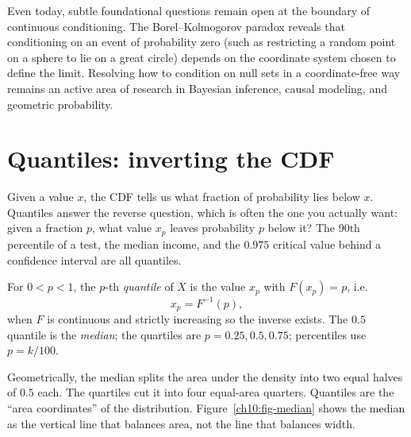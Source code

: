 \begin{historybox}
Even today, subtle foundational questions remain open at the boundary of continuous
conditioning. The Borel--Kolmogorov paradox reveals that conditioning on an event of
probability zero (such as restricting a random point on a sphere to lie on a great
circle) depends on the coordinate system chosen to define the limit. Resolving how
to condition on null sets in a coordinate-free way remains an active area of
research in Bayesian inference, causal modeling, and geometric probability.
\end{historybox}

\section{Quantiles: inverting the CDF}
\label{ch10:quantiles}

Given a value $x$, the CDF tells us what fraction of probability lies below $x$.
Quantiles answer the reverse question, which is often the one you actually want:
given a fraction $p$, what value $x_p$ leaves probability $p$ below it? The $90$th
percentile of a test, the median income, and the $0.975$ critical value behind a
confidence interval are all quantiles.

\begin{definition}
\label{ch10:def-quantile}
For $0 < p < 1$, the $p$-th \emph{quantile} of $X$ is the value $x_p$ with
$F(x_p) = p$, i.e.
\[
  x_p = F^{-1}(p),
\]
when $F$ is continuous and strictly increasing so the inverse exists. The $0.5$
quantile is the \emph{median}; the quartiles are $p = 0.25, 0.5, 0.75$; percentiles
use $p = k/100$.
\end{definition}

Geometrically, the median splits the area under the density into two equal halves of
$0.5$ each. The quartiles cut it into four equal-area quarters. Quantiles are the
``area coordinates'' of the distribution. Figure~\ref{ch10:fig-median} shows the
median as the vertical line that balances area, not the line that balances width.

